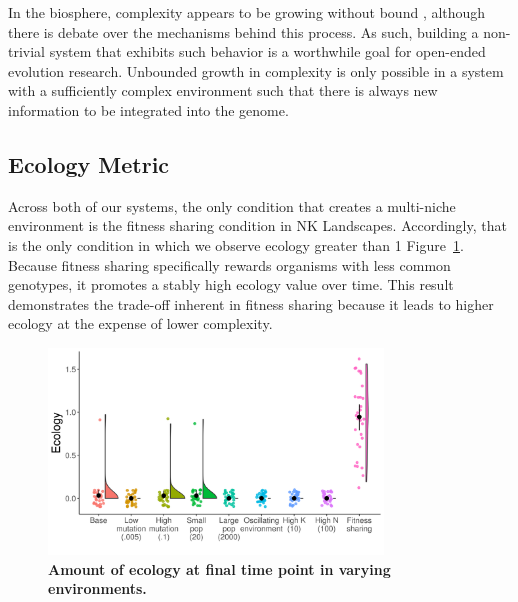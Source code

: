 \documentclass[letterpaper]{article}
\begin{document}
In the biosphere, complexity appears to be growing without bound \citep{Korb:2011kg}, although there is debate over the mechanisms behind this process. As such, building a non-trivial system that exhibits such behavior is a worthwhile goal for open-ended evolution research. Unbounded growth in complexity is only possible in a system with a sufficiently complex environment such that there is always new information to be integrated into the genome.

\subsection{Ecology Metric}

Across both of our systems, the only condition that creates a multi-niche environment is the fitness sharing condition in NK Landscapes. Accordingly, that is the only condition in which we observe ecology greater than 1 Figure~\ref{ecology}. Because fitness sharing specifically rewards organisms with less common genotypes, it promotes a stably high ecology value over time. This result demonstrates the trade-off inherent in fitness sharing because it leads to higher ecology at the expense of lower complexity.

\begin{figure}
\includegraphics[width=3.5in]{figs/ecologyboxplots.png}
\caption{\textbf{Amount of ecology at final time point in varying environments.} }
\label{ecology}
\end{figure}

\end{document}
